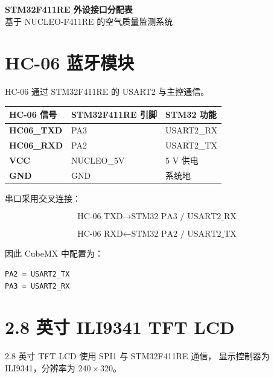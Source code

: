 \documentclass[12pt,a4paper]{ctexart}
\begin{document}
\begin{center}
    {\LARGE\bfseries STM32F411RE 外设接口分配表}\\[0.5em]
    {\large 基于 NUCLEO-F411RE 的空气质量监测系统}
\end{center}

\vspace{1em}

\section{HC-06 蓝牙模块}

HC-06 通过 STM32F411RE 的 USART2 与主控通信。

\begin{table}[htbp]
\centering
{}
\begin{tabularx}{0.9\textwidth}{>{\bfseries}Y Y Y}
\toprule
{}
\color{white}HC-06 信号 &
\color{white}STM32F411RE 引脚 &
\color{white}STM32 功能 \\
\midrule
HC06\_TXD & PA3 & USART2\_RX \\
HC06\_RXD & PA2 & USART2\_TX \\
VCC & NUCLEO\_5V & 5 V 供电 \\
GND & GND & 系统地 \\
\bottomrule
\end{tabularx}
\end{table}

串口采用交叉连接：

\[
\text{HC-06 TXD}
\rightarrow
\text{STM32 PA3 / USART2\_RX}
\]

\[
\text{HC-06 RXD}
\leftarrow
\text{STM32 PA2 / USART2\_TX}
\]

因此 CubeMX 中配置为：

\begin{verbatim}
PA2 = USART2_TX
PA3 = USART2_RX
\end{verbatim}

\section{2.8 英寸 ILI9341 TFT LCD}

2.8 英寸 TFT LCD 使用 SPI1 与 STM32F411RE 通信，
显示控制器为 ILI9341，分辨率为 $240\times320$。
\end{document}
